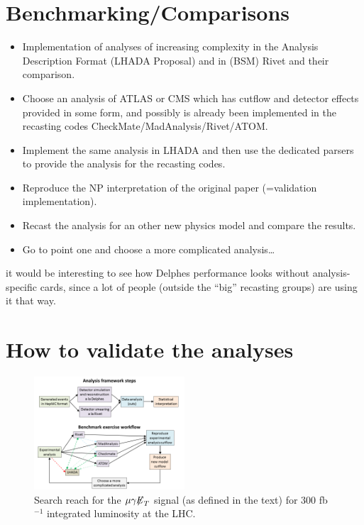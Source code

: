 \documentclass[11pt]{cernrep}
\begin{document}
\section{Benchmarking/Comparisons}

\begin{itemize}
  \item Implementation of analyses of increasing complexity in the Analysis Description Format (LHADA Proposal) and in (BSM) Rivet and their comparison.
  \item Choose an analysis of ATLAS or CMS which has cutflow and detector effects provided in some form, and possibly is already been implemented in the recasting codes CheckMate/MadAnalysis/Rivet/ATOM.
  \item Implement the same analysis in LHADA and then use the dedicated parsers to provide the analysis for the recasting codes.
  \item Reproduce the NP interpretation of the original paper (=validation implementation).
  \item Recast the analysis for an other new physics model and compare the results.
  \item Go to point one and choose a more complicated analysis…
\end{itemize}
it would be interesting to see how Delphes performance looks without analysis-specific cards, since a lot of people (outside the “big” recasting groups) are using it that way.

\section{How to validate the analyses}
\begin{figure}
\begin{center}
\includegraphics[width=0.5\textwidth]{figures/lhada_benchmarking_excersise.png}
 \caption{Search reach for the $\mu \gamma {\not\!\!E}_{T}$ signal
(as defined in the
   text) for
   300 fb$^{-1}$ integrated luminosity  at the LHC.
}
\label{search}
\end{center}
\end{figure}
\end{document}
